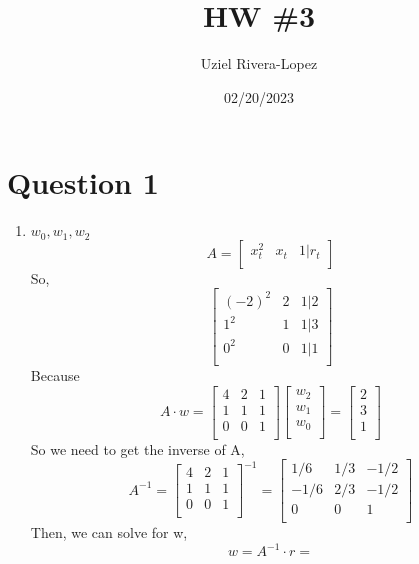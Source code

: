 \documentclass{article}
\title{HW \#3}
\author{
    Uziel Rivera-Lopez
}
\date{02/20/2023}
\begin{document}
\maketitle

\section*{Question 1}
\begin{enumerate}[label=\alph*)]
    \item $w_0, w_1, w_2$
    \[
        A = 
        \begin{bmatrix}
        x_{t}^2 & x_{t} & 1 | r_{t} \\ 
        \end{bmatrix}
        \]
    So, 
    \[
        \begin{bmatrix}
        (-2)^2 & 2 & 1 | 2 \\
        1^2 & 1 & 1 | 3 \\ 
        0^2 & 0 & 1 | 1 \\
        \end{bmatrix}
        \]
    Because
        \[
A \cdot w = 
\begin{bmatrix}
4 & 2 & 1 \\
1 & 1 & 1 \\ 
0 & 0 & 1 \\
\end{bmatrix}
\begin{bmatrix}
w_{2} \\
w_{1} \\
w_{0} \\
\end{bmatrix}=
\begin{bmatrix}
2 \\
3 \\
1 \\
\end{bmatrix}
\] 
So we need to get the inverse of A,
\[
A^{-1} =
\begin{bmatrix}
4 & 2 & 1 \\
1 & 1 & 1 \\
0 & 0 & 1 \\
\end{bmatrix}^{-1} =
\begin{bmatrix}
1/6 & 1/3 & -1/2 \\
-1/6 & 2/3 & -1/2 \\
0 & 0 & 1 \\
\end{bmatrix}
\]
Then, we can solve for w,
\[
w = A^{-1} \cdot r =
\]
\end{enumerate}
\end{document}
